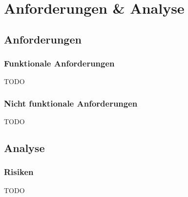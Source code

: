 
\chapter{Anforderungen \& Analyse}
\section{Anforderungen}
\subsection{Funktionale Anforderungen}
\begin{flushleft}
TODO
\end{flushleft}
\subsection{Nicht funktionale Anforderungen}
\begin{flushleft}
TODO
\end{flushleft}
\section{Analyse}
\subsection{Risiken}
\begin{flushleft}
TODO
\end{flushleft}